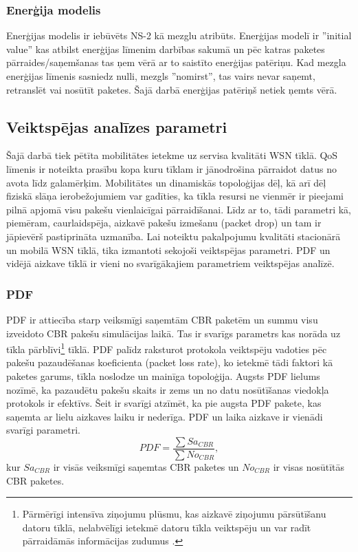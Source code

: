\subsubsection{Enerģija modelis}
Enerģijas modelis ir iebūvēts NS-2 kā mezglu atribūts. Enerģijas modelī ir ''initial value'' kas atbilst enerģijas līmenim darbības sakumā un pēc katras paketes pārraides/saņemšanas tas ņem vērā ar to saistīto enerģijas patēriņu. Kad mezgla enerģijas līmenis sasniedz nulli, mezgls ''nomirst'', tas vairs nevar saņemt, retranslēt vai nosūtīt paketes. Šajā darbā enerģijas patēriņš netiek ņemts vērā.


\subsection{Veiktspējas analīzes parametri}
Šajā darbā tiek pētīta mobilitātes ietekme uz servisa kvalitāti WSN tīklā. QoS līmenis ir noteikta prasību kopa kuru tīklam ir jānodrošina pārraidot datus no avota līdz galamērķim. Mobilitātes un dinamiskās topoloģijas dēļ, kā arī dēļ fiziskā slāņa ierobežojumiem var gadīties, ka tīkla resursi ne vienmēr ir pieejami pilnā apjomā visu pakešu vienlaicīgai pārraidīšanai. Līdz ar to, tādi parametri kā, piemēram, caurlaidspēja, aizkavē pakešu izmešanu (packet drop) un tam ir jāpievērš pastiprināta uzmanība. Lai noteiktu pakalpojumu kvalitāti stacionārā un mobilā WSN tīklā, tika izmantoti sekojoši veiktspējas parametri. \ac{PDF} un vidējā aizkave tīklā ir vieni no svarīgākajiem parametriem veiktspējas analīzē.

\subsubsection{\acl{PDF}}
\acf{PDF} ir attiecība starp veiksmīgi saņemtām CBR paketēm un summu visu izveidoto CBR pakešu simulācijas laikā. Tas ir svarīgs parametrs kas norāda uz tīkla pārblīvi\footnote{Pārmērīgi intensīva ziņojumu plūsmu, kas aizkavē ziņojumu pārsūtīšanu datoru tīklā, nelabvēlīgi ietekmē datoru tīkla veiktspēju un var radīt pārraidāmās informācijas zudumus \cite{lza}.} tīklā. PDF palīdz raksturot protokola veiktspēju vadoties pēc pakešu pazaudēšanas koeficienta (packet loss rate), ko ietekmē tādi faktori kā paketes garums, tīkla noslodze un mainīga topoloģija. Augsts PDF lielums nozīmē, ka pazaudētu pakešu skaits ir zems un no datu nosūtīšanas viedokļa protokols ir efektīvs. Šeit ir svarīgi atzīmēt, ka pie augsta PDF pakete, kas saņemta ar lielu aizkaves laiku ir nederīga. PDF un laika aizkave ir vienādi svarīgi parametri.
\begin{equation}
 PDF=\frac{\sum Sa_{CBR}}{\sum No_{CBR}},
\end{equation}
kur $Sa_{CBR}$ ir visās veiksmīgi saņemtas CBR paketes un $No_{CBR}$ ir visas nosūtītās CBR paketes.

